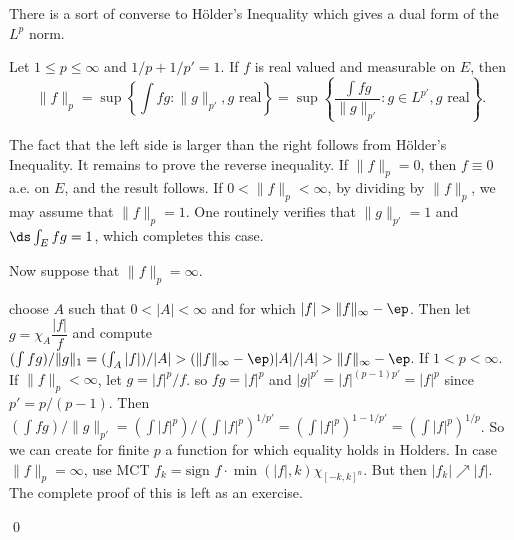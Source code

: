 There is a sort of converse to H\"older's Inequality which gives a dual form of the $L^p$ norm.


\begin{thm}
Let $1 \leq p \leq \infty$ and $1/p+1/p'=1$. If $f$ is real valued and measurable on $E$, then 
	\[
	\|f\|_p = \sup \left\{ \int fg \colon \|g\|_{p'}, g \text{ real} \right\}= \sup \left\{ \dfrac{\int fg}{\|g\|_{p'}} \colon g \in L^{p'}, g \text{ real} \right\}.
	\]
\end{thm}

\pf The fact that the left side is larger than the right follows from H\"older's Inequality. It remains to prove the reverse inequality. If $\|f\|_p=0$, then $f \equiv 0$ a.e. on $E$, and the result follows. If $0<\|f\|_p<\infty$, by dividing by $\|f\|_p$, we may assume that $\|f\|_p=1$. One routinely verifies that $\|g\|_{p'}= 1$ and $\ds \int_E fg= 1$, which completes this case. 

Now suppose that $\|f\|_p= \infty$. 




choose $A$ such that $0<|A|<\infty$ and for which $|f|>\|f\|_\infty - \ep$. Then let $g = \chi_A \dfrac{|f|}{f}$ and compute $(\int fg)/ \|g\|_1= (\int_A |f|)/|A|> (\|f\|_\infty - \ep)|A|/|A|> \|f\|_\infty - \ep$. If $1<p<\infty$. If $\|f\|_p < \infty$, let $g= |f|^p/f$. so $fg= |f|^p$ and $|g|^{p'}= |f|^{(p-1)p'}= |f|^p$ since $p'= p/(p-1)$. Then $(\int fg) / \|g\|_{p'}= (\int |f|^p)/ (\int |f|^p)^{1/p'}= (\int |f|^p)^{1-1/p'}= (\int |f|^p)^{1/p}$. So we can create for finite $p$ a function for which equality holds in Holders. In case $\|f\|_p= \infty$, use MCT $f_k = \text{sign }f \cdot \min(|f|,k) \chi_{[-k,k]^n}$. But then $|f_k| \nearrow |f|$. The complete proof of this is left as an exercise. 



\qed \\




































